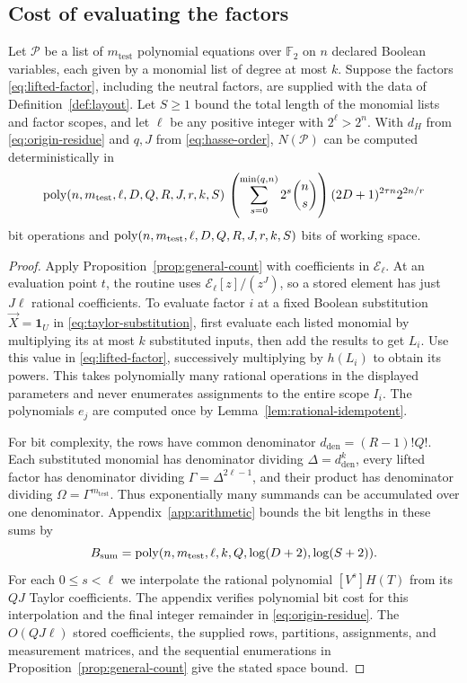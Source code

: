 \subsection{Cost of evaluating the factors}\label{subsec:one-query-cost}
\begin{proposition}\label{prop:count}
Let $\mathcal P$ be a list of $m_{\mathrm{test}}$ polynomial equations
over $\mathbb F_2$ on $n$ declared Boolean variables, each given by
a monomial list of degree at most $k$. Suppose the factors
\eqref{eq:lifted-factor}, including the neutral factors, are supplied
with the data of Definition~\ref{def:layout}. Let $S\ge1$ bound
the total length of the monomial lists and factor scopes, and let
$\ell$ be any positive integer with $2^\ell>2^n$. With $d_H$ from
\eqref{eq:origin-residue} and $q,J$ from \eqref{eq:hasse-order},
$N(\mathcal P)$ can be computed deterministically in
\[
 \operatorname{poly}(n,m_{\mathrm{test}},\ell,D,Q,R,J,r,k,S)\,
 \left(\sum_{s=0}^{\min(q,n)}2^s\binom ns\right)
 (2D+1)^{2\tau n}2^{2n/r}
\]
bit operations and $\operatorname{poly}(n,m_{\mathrm{test}},\ell,D,Q,R,J,r,k,S)$
bits of working space.
\end{proposition}
\begin{proof}
Apply Proposition~\ref{prop:general-count} with coefficients in
$\mathcal E_\ell$. At an evaluation point $t$, the routine uses
$\mathcal E_\ell[z]/(z^J)$, so a stored element has just $J\ell$
rational coefficients. To evaluate factor $i$ at a fixed Boolean
substitution $\vec X=\mathbf1_U$ in \eqref{eq:taylor-substitution}, first
evaluate each listed monomial by multiplying its at most $k$ substituted
inputs, then add the results to get $L_i$. Use this value in
\eqref{eq:lifted-factor}, successively multiplying by $h(L_i)$ to
obtain its powers. This takes polynomially many rational operations in
the displayed parameters and never enumerates assignments to the entire
scope $I_i$. The polynomials $e_j$ are computed once by
Lemma~\ref{lem:rational-idempotent}.

For bit complexity, the rows have common denominator
$d_{\mathrm{den}}=(R-1)!Q!$. Each substituted monomial has denominator
dividing $\Delta=d_{\mathrm{den}}^k$, every lifted factor has denominator
dividing $\Gamma=\Delta^{2\ell-1}$, and their product has denominator
dividing $\Omega=\Gamma^{m_{\mathrm{test}}}$. Thus exponentially many
summands can be accumulated over one denominator.
Appendix~\ref{app:arithmetic} bounds the bit lengths in these sums by
\begin{equation}\label{eq:sum-bit-bound}
 B_{\mathrm{sum}}=\operatorname{poly}(n,m_{\mathrm{test}},\ell,k,Q,\log(D+2),\log(S+2)).
\end{equation}
For each $0\le s<\ell$ we interpolate the rational polynomial
$[V^s]H(T)$ from its $QJ$ Taylor coefficients. The appendix verifies
polynomial bit cost for this interpolation and the final integer
remainder in \eqref{eq:origin-residue}. The $O(QJ\ell)$ stored
coefficients, the supplied rows, partitions, assignments, and measurement matrices, and the sequential enumerations in
Proposition~\ref{prop:general-count} give the stated space bound.
\end{proof}

